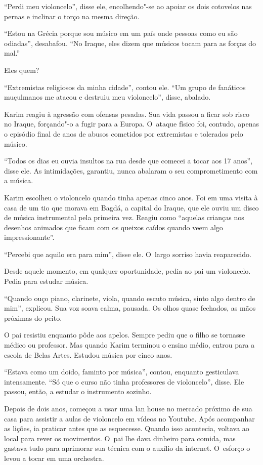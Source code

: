 ``Perdi meu violoncelo'', disse ele, encolhendo"-se ao apoiar os dois
cotovelos nas pernas e inclinar o torço na mesma direção.

``Estou na Grécia porque sou músico em um país onde pessoas como eu são
odiadas'', desabafou. ``No Iraque, eles dizem que músicos tocam para as
forças do mal.''

Eles quem?

``Extremistas religiosos da minha cidade'', contou ele. ``Um grupo de
fanáticos muçulmanos me atacou e destruiu meu violoncelo'', disse,
abalado.

Karim reagiu à agressão com ofensas pesadas. Sua vida passou a ficar sob
risco no Iraque, forçando"-o a fugir para a Europa. O~ataque físico foi,
contudo, apenas o episódio final de anos de abusos cometidos por
extremistas e tolerados pelo músico.

``Todos os dias eu ouvia insultos na rua desde que comecei a tocar aos
17 anos'', disse ele. As intimidações, garantiu, nunca abalaram o seu
comprometimento com a música.

Karim escolheu o violoncelo quando tinha apenas cinco anos. Foi em uma
visita à casa de um tio que morava em Bagdá, a capital do Iraque, que
ele ouviu um disco de música instrumental pela primeira vez. Reagiu como
``aquelas crianças nos desenhos animados que ficam com os queixos caídos
quando veem algo impressionante''.

``Percebi que aquilo era para mim'', disse ele. O~largo sorriso havia
reaparecido.

Desde aquele momento, em qualquer oportunidade, pedia ao pai um
violoncelo. Pedia para estudar música.

``Quando ouço piano, clarinete, viola, quando escuto música, sinto algo
dentro de mim'', explicou. Sua voz soava calma, pausada. Os olhos quase
fechados, as mãos próximas do peito.

O pai resistiu enquanto pôde aos apelos. Sempre pediu que o filho se
tornasse médico ou professor. Mas quando Karim terminou o ensino médio,
entrou para a escola de Belas Artes. Estudou música por cinco anos.

``Estava como um doido, faminto por música'', contou, enquanto
gesticulava intensamente. ``Só que o curso não tinha professores de
violoncelo'', disse. Ele passou, então, a estudar o instrumento sozinho.

Depois de dois anos, começou a usar uma lan house no mercado próximo de
sua casa para assistir a aulas de violoncelo em vídeos no Youtube. Após
acompanhar as lições, ia praticar antes que as esquecesse. Quando isso
acontecia, voltava ao local para rever os movimentos. O~pai lhe dava
dinheiro para comida, mas gastava tudo para aprimorar sua técnica com o
auxílio da internet. O~esforço o levou a tocar em uma orchestra.

